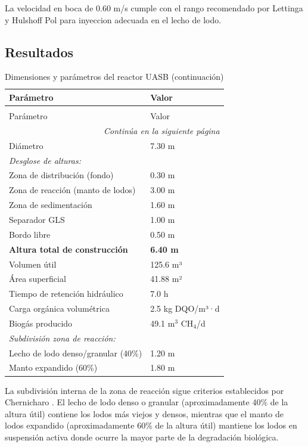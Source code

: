 \documentclass[12pt,a4paper]{article}
\begin{document}
La velocidad en boca de 0.60 m/s cumple con el rango recomendado por Lettinga y Hulshoff Pol para inyeccion adecuada en el lecho de lodo.

\subsection{Resultados}

\begingroup
\small
\begin{longtable}{ll}
\caption{Dimensiones y parámetros del reactor UASB}\\
\toprule
Parámetro & Valor \\
\midrule
\endfirsthead
\caption[]{Dimensiones y parámetros del reactor UASB (continuación)}\\
\toprule
Parámetro & Valor \\
\midrule
\endhead
\midrule
\multicolumn{2}{r}{\textit{Continúa en la siguiente página}} \\
\endfoot
\bottomrule
\endlastfoot
Diámetro & 7.30 m \\
\multicolumn{2}{l}{\textit{Desglose de alturas:}} \\
\quad Zona de distribución (fondo) & 0.30 m \\
\quad Zona de reacción (manto de lodos) & 3.00 m \\
\quad Zona de sedimentación & 1.60 m \\
\quad Separador GLS & 1.00 m \\
\quad Bordo libre & 0.50 m \\
\midrule
\textbf{Altura total de construcción} & \textbf{6.40 m} \\
\midrule
Volumen útil & 125.6 m³ \\
Área superficial & 41.88 m² \\
Tiempo de retención hidráulico & 7.0 h \\
Carga orgánica volumétrica & 2.5 kg DQO/m³·d \\
Biogás producido & 49.1 m$^3$ CH$_4$/d \\
\midrule
\multicolumn{2}{l}{\textit{Subdivisión zona de reacción:}} \\
\quad Lecho de lodo denso/granular (40\%) & 1.20 m \\
\quad Manto expandido (60\%) & 1.80 m \\
\end{longtable}
\endgroup

La subdivisión interna de la zona de reacción sigue criterios establecidos por Chernicharo \cite{chernicharo2007}. El lecho de lodo denso o granular (aproximadamente 40\% de la altura útil) contiene los lodos más viejos y densos, mientras que el manto de lodos expandido (aproximadamente 60\% de la altura útil) mantiene los lodos en suspensión activa donde ocurre la mayor parte de la degradación biológica.
\end{document}

